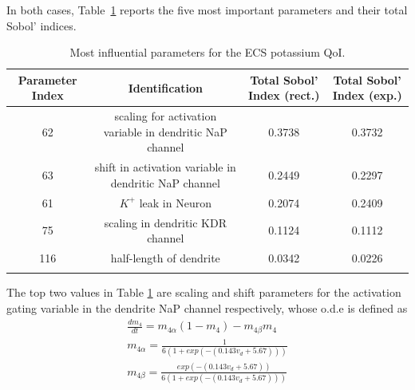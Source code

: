 In both cases, Table~\ref{tab:K_ECS_Mean} reports the five most important parameters and their total Sobol' indices. 


\begin{table}[h]
\centering
{}
\begin{tabular}{cccc}
\toprule
Parameter Index & Identification & Total Sobol' Index (rect.) & Total Sobol' Index (exp.)\\
\midrule
62 & scaling for activation variable in dendritic NaP channel  &  0.3738 & 0.3732\\
63 &  shift in activation variable in dendritic NaP channel &  0.2449 & 0.2297\\
61 & $K^+$ leak in  Neuron &0.2074 & 0.2409\\
75 & scaling in dendritic KDR channel & 0.1124 & 0.1112\\
116 & half-length of dendrite & 0.0342 & 0.0226\\
 \arrayrulecolor{black}\bottomrule
\end{tabular}
\caption{Most influential parameters for the ECS potassium QoI.}
\label{tab:K_ECS_Mean}
\end{table}
The top two values in Table \ref{tab:K_ECS_Mean} are scaling and shift parameters for the activation gating variable in the dendrite NaP channel respectively, whose o.d.e is defined as 
\begin{eqnarray}\label{eqn:m4}
\frac{dm_4}{dt}=m_{4 \alpha}(1-m_4)-m_{4 \beta}m_4 \nonumber \\
m_{4 \alpha}=  \frac{1}{6(1 + exp(-(0.143  v_d + 5.67)))}\nonumber \\
m_{4 \beta}= \frac{exp(-(0.143 v_d + 5.67))}{6(1 + exp(-(0.143 v_d + 5.67)))}
\end{eqnarray}
